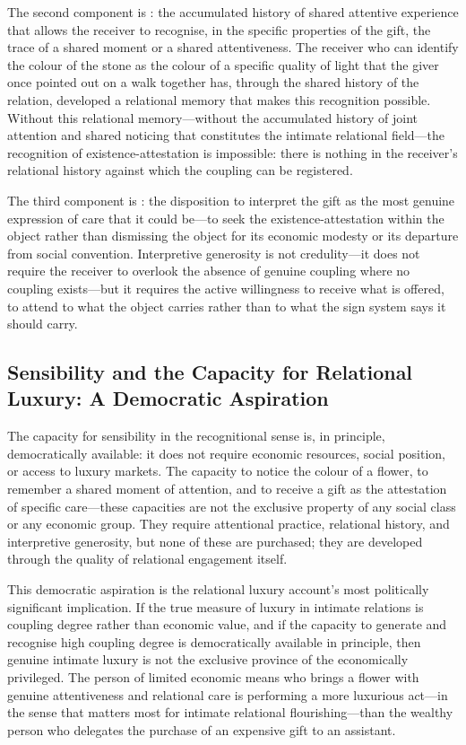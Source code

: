 The second component is : the accumulated history of shared attentive experience that allows the receiver to recognise, in the specific properties of the gift, the trace of a shared moment or a shared attentiveness. The receiver who can identify the colour of the stone as the colour of a specific quality of light that the giver once pointed out on a walk together has, through the shared history of the relation, developed a relational memory that makes this recognition possible. Without this relational memory---without the accumulated history of joint attention and shared noticing that constitutes the intimate relational field---the recognition of existence-attestation is impossible: there is nothing in the receiver's relational history against which the coupling can be registered.

The third component is : the disposition to interpret the gift as the most genuine expression of care that it could be---to seek the existence-attestation within the object rather than dismissing the object for its economic modesty or its departure from social convention. Interpretive generosity is not credulity---it does not require the receiver to overlook the absence of genuine coupling where no coupling exists---but it requires the active willingness to receive what is offered, to attend to what the object carries rather than to what the sign system says it should carry.

\subsection{Sensibility and the Capacity for Relational Luxury: A Democratic Aspiration}
\label{p16:subsec:democratic}

\noindent
The capacity for sensibility in the recognitional sense is, in principle, democratically available: it does not require economic resources, social position, or access to luxury markets. The capacity to notice the colour of a flower, to remember a shared moment of attention, and to receive a gift as the attestation of specific care---these capacities are not the exclusive property of any social class or any economic group. They require attentional practice, relational history, and interpretive generosity, but none of these are purchased; they are developed through the quality of relational engagement itself.

This democratic aspiration is the relational luxury account's most politically significant implication. If the true measure of luxury in intimate relations is coupling degree rather than economic value, and if the capacity to generate and recognise high coupling degree is democratically available in principle, then genuine intimate luxury is not the exclusive province of the economically privileged. The person of limited economic means who brings a flower with genuine attentiveness and relational care is performing a more luxurious act---in the sense that matters most for intimate relational flourishing---than the wealthy person who delegates the purchase of an expensive gift to an assistant.

